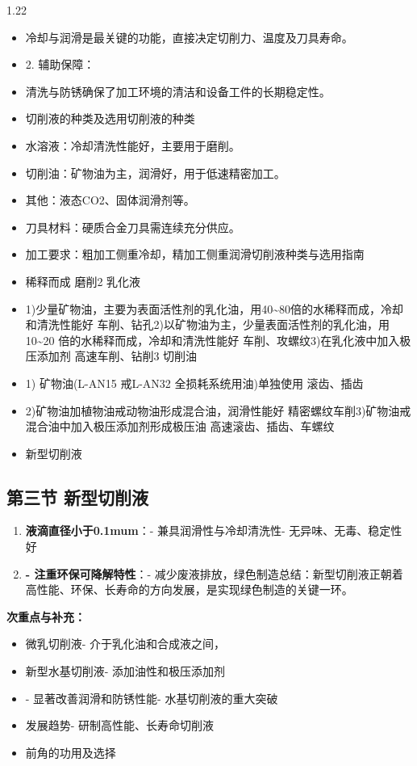 \documentclass[12pt,a4paper]{article}
\begin{document}
\begin{spacing}{1.22}
\begin{itemize}[leftmargin=2.2em,label=--]
  \item 冷却与润滑是最关键的功能，直接决定切削力、温度及刀具寿命。
  \item 2. 辅助保障：
  \item 清洗与防锈确保了加工环境的清洁和设备工件的长期稳定性。
  \item 切削液的种类及选用切削液的种类
  \item 水溶液：冷却清洗性能好，主要用于磨削。
  \item 切削油：矿物油为主，润滑好，用于低速精密加工。
  \item 其他：液态CO2、固体润滑剂等。
  \item 刀具材料：硬质合金刀具需连续充分供应。
  \item 加工要求：粗加工侧重冷却，精加工侧重润滑切削液种类与选用指南
  \item 稀释而成 磨削2 乳化液
  \item 1)少量矿物油，主要为表面活性剂的乳化油，用40\textasciitilde{}80倍的水稀释而成，冷却和清洗性能好 车削、钻孔2)以矿物油为主，少量表面活性剂的乳化油，用10\textasciitilde{}20 倍的水稀释而成，冷却和清洗性能好 车削、攻螺纹3)在乳化液中加入极压添加剂 高速车削、钻削3 切削油
  \item 1) 矿物油(L-AN15 戒L-AN32 全损耗系统用油)单独使用 滚齿、插齿
  \item 2)矿物油加植物油戒动物油形成混合油，润滑性能好 精密螺纹车削3)矿物油戒混合油中加入极压添加剂形成极压油 高速滚齿、插齿、车螺纹
  \item 新型切削液
\end{itemize}

\subsection{第三节 新型切削液}
\begin{tcolorbox}[colback=yellow!6,colframe=red!55!black,title=重点,left=1mm,right=1mm]
\begin{enumerate}[leftmargin=2.2em,label=\arabic*.]
  \item \textbf{液滴直径小于0.1mum}：- 兼具润滑性与冷却清洗性- 无异味、无毒、稳定性好
  \item \textbf{- 注重环保可降解特性}：- 减少废液排放，绿色制造总结：新型切削液正朝着高性能、环保、长寿命的方向发展，是实现绿色制造的关键一环。
\end{enumerate}
\end{tcolorbox}
\noindent\textbf{次重点与补充：}
\begin{itemize}[leftmargin=2.2em,label=--]
  \item 微乳切削液- 介于乳化油和合成液之间，
  \item 新型水基切削液- 添加油性和极压添加剂
  \item - 显著改善润滑和防锈性能- 水基切削液的重大突破
  \item 发展趋势- 研制高性能、长寿命切削液
  \item 前角的功用及选择
\end{itemize}


\end{spacing}
\end{document}
